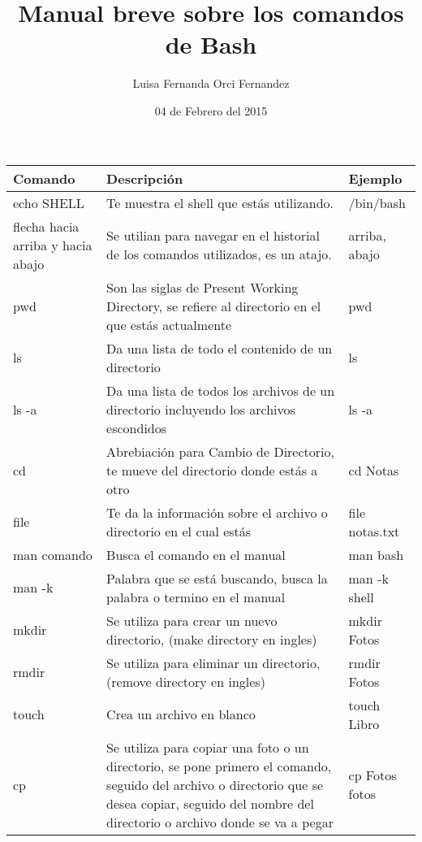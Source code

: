 \documentclass[12pt]{article}
\title{Manual breve sobre los comandos de Bash}
\author{Luisa Fernanda Orci Fernandez}
\date{04 de Febrero del 2015}
\begin{document}
\maketitle
\begin{longtable}{|p{1 in}|p{3.0 in}|p{2 in}|}
\hline
Comando & Descripci\'on & Ejemplo \\
\hline
echo SHELL & Te muestra el shell que est\'as utilizando. & /bin/bash \\
flecha hacia arriba y hacia abajo & Se utilian para navegar en el historial de los comandos utilizados, es un atajo. & arriba, abajo \\

pwd & Son las siglas de Present Working Directory, se refiere al directorio en el que est\'as actualmente & pwd \\

ls & Da una lista de todo el contenido de un directorio & ls \\

ls -a & Da una lista de todos los archivos de un directorio incluyendo los archivos escondidos & ls -a \\

cd & Abrebiaci\'on para Cambio de Directorio, te mueve del directorio donde est\'as a otro & cd Notas \\

file & Te da la informaci\'on sobre el archivo o directorio en el cual est\'as & file notas.txt \\

man comando & Busca el comando en el manual & man bash \\

man -k & Palabra que se est\'a buscando, busca la palabra o termino en el manual & man -k shell \\

mkdir & Se utiliza para crear un nuevo directorio, (make directory en ingles) & mkdir Fotos \\

rmdir & Se utiliza para eliminar un directorio, (remove directory en ingles) & rmdir Fotos \\

touch & Crea un archivo en blanco & touch Libro \\

cp & Se utiliza para copiar una foto o un directorio, se pone primero el comando, seguido del archivo o directorio que se desea copiar, seguido del nombre del directorio o archivo donde se va a pegar & cp Fotos fotos \\


\end{longtable}
\end{document}
